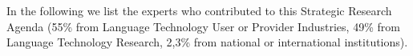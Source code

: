 \documentclass[10pt, plain]{../../metanetpaper}
\begin{document}
\begin{multicols}{2}
%

\end{multicols}

\clearpage


\appendix
{}





\clearpage


\label{sec:list-of-contributors}

In the following we list the experts who contributed to this Strategic Research Agenda (55\% from Language Technology User or Provider Industries, 49\% from Language Technology Research, 2,3\% from national or international institutions).

\end{document}
